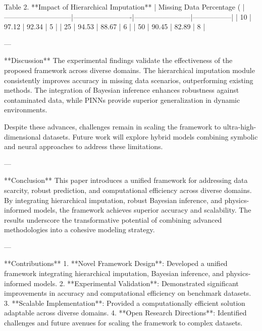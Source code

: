 Table 2. **Impact of Hierarchical Imputation**  
| Missing Data Percentage (%
|-----------------------------|-------------------------|------------------------|-----------------|  
| 10                          | 97.12                  | 92.34                 | 5               |  
| 25                          | 94.53                  | 88.67                 | 6               |  
| 50                          | 90.45                  | 82.89                 | 8               |  

---

**Discussion**  
The experimental findings validate the effectiveness of the proposed framework across diverse domains. The hierarchical imputation module consistently improves accuracy in missing data scenarios, outperforming existing methods. The integration of Bayesian inference enhances robustness against contaminated data, while PINNs provide superior generalization in dynamic environments.

Despite these advances, challenges remain in scaling the framework to ultra-high-dimensional datasets. Future work will explore hybrid models combining symbolic and neural approaches to address these limitations.

---

**Conclusion**  
This paper introduces a unified framework for addressing data scarcity, robust prediction, and computational efficiency across diverse domains. By integrating hierarchical imputation, robust Bayesian inference, and physics-informed models, the framework achieves superior accuracy and scalability. The results underscore the transformative potential of combining advanced methodologies into a cohesive modeling strategy.

---

**Contributions**  
1. **Novel Framework Design**: Developed a unified framework integrating hierarchical imputation, Bayesian inference, and physics-informed models.  
2. **Experimental Validation**: Demonstrated significant improvements in accuracy and computational efficiency on benchmark datasets.  
3. **Scalable Implementation**: Provided a computationally efficient solution adaptable across diverse domains.  
4. **Open Research Directions**: Identified challenges and future avenues for scaling the framework to complex datasets.  

